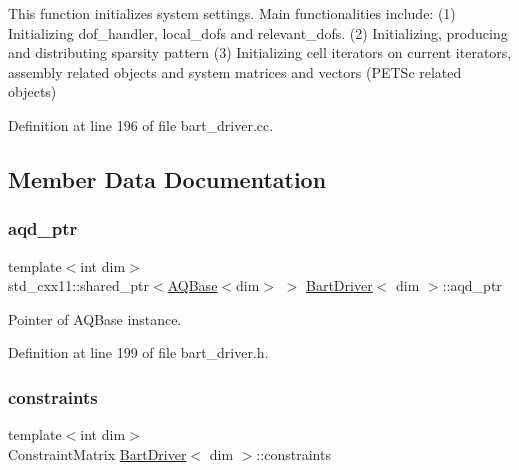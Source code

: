 This function initializes system settings. Main functionalities include\+: (1) Initializing dof\+\_\+handler, local\+\_\+dofs and relevant\+\_\+dofs. (2) Initializing, producing and distributing sparsity pattern (3) Initializing cell iterators on current iterators, assembly related objects and system matrices and vectors (P\+E\+T\+Sc related objects) 

Definition at line 196 of file bart\+\_\+driver.\+cc.



\subsection{Member Data Documentation}
\mbox{\label{class_bart_driver_a818149e4acfe5a7108ef42938650ff11}} 
\subsubsection{\texorpdfstring{aqd\+\_\+ptr}{aqd\_ptr}}
{\footnotesize\ttfamily template$<$int dim$>$ \\
std\+\_\+cxx11\+::shared\+\_\+ptr$<$\hyperlink{class_a_q_base}{A\+Q\+Base}$<$dim$>$ $>$ \hyperlink{class_bart_driver}{Bart\+Driver}$<$ dim $>$\+::aqd\+\_\+ptr\hspace{0.3cm}{\ttfamily [private]}}



Pointer of A\+Q\+Base instance. 



Definition at line 199 of file bart\+\_\+driver.\+h.

\mbox{\label{class_bart_driver_a2414c8e66212bb95c86f1c70db4a4099}} 
\subsubsection{\texorpdfstring{constraints}{constraints}}
{\footnotesize\ttfamily template$<$int dim$>$ \\
Constraint\+Matrix \hyperlink{class_bart_driver}{Bart\+Driver}$<$ dim $>$\+::constraints\hspace{0.3cm}{\ttfamily [private]}}



